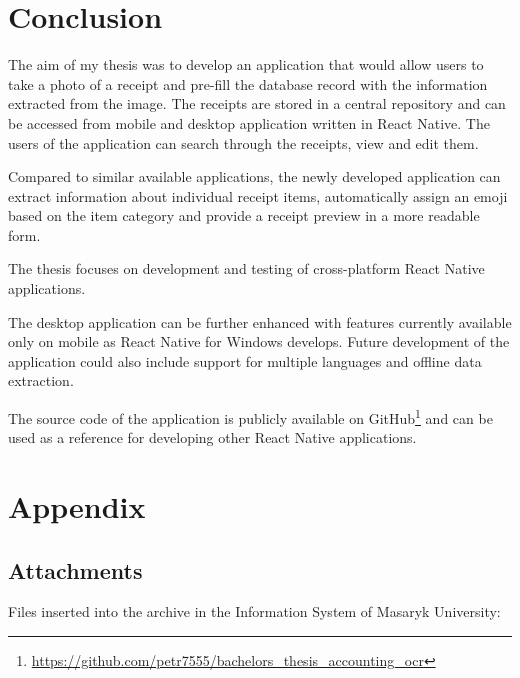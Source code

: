 \documentclass[
  digital, %
  table,   %
  oneside, %
  lof,     %
  lot,     %
]{fithesis3}
\DeclareRobustCommand{\thinskip}{\hskip 0.16667em\relax}
\def\emdash{---}
\def\dosh#1#2{\unskip#1\thinskip#2\thinskip\ignorespaces}
\def\Dash{\dosh\nobreak\emdash}
\begin{document}
\chapter{Conclusion}
The aim of my thesis was to develop an application that would allow users to take a photo of a receipt and pre-fill the database record with the information extracted from the image. The receipts are stored in a central repository and can be accessed from mobile and desktop application written in React Native. The users of the application can search through the receipts, view and edit them.

Compared to similar available applications, the newly developed application can extract information about individual receipt items, automatically assign an emoji based on the item category and provide a receipt preview in a more readable form.

The thesis focuses on development and testing of  cross-platform React Native applications.

The desktop application can be further enhanced with features currently available only on mobile as React Native for Windows develops. Future development of the application could also include support for multiple languages and offline data extraction.  

The source code of the application is publicly available on GitHub\footnote{\url{https://github.com/petr7555/bachelors_thesis_accounting_ocr}} and can be used as a reference for developing other React Native applications.



\appendix %

\chapter{Appendix}
\section{Attachments}
Files inserted into the archive in the Information System of Masaryk
University:
\end{document}
